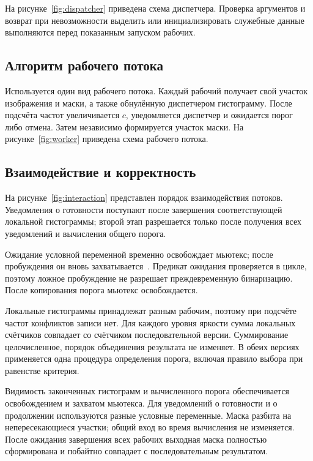 На рисунке~\ref{fig:dispatcher} приведена схема диспетчера. Проверка аргументов и возврат при невозможности выделить или инициализировать служебные данные выполняются перед показанным запуском рабочих.

\clearpage\subsection{Алгоритм рабочего потока}
Используется один вид рабочего потока. Каждый рабочий получает свой участок изображения и маски, а также обнулённую диспетчером гистограмму. После подсчёта частот увеличивается $c$, уведомляется диспетчер и ожидается порог либо отмена. Затем независимо формируется участок маски. На рисунке~\ref{fig:worker} приведена схема рабочего потока.

\clearpage\subsection{Взаимодействие и корректность}
На рисунке~\ref{fig:interaction} представлен порядок взаимодействия потоков. Уведомления о готовности поступают после завершения соответствующей локальной гистограммы; второй этап разрешается только после получения всех уведомлений и вычисления общего порога.

Ожидание условной переменной временно освобождает мьютекс; после пробуждения он вновь захватывается~\cite{posix}. Предикат ожидания проверяется в цикле, поэтому ложное пробуждение не разрешает преждевременную бинаризацию. После копирования порога мьютекс освобождается.

Локальные гистограммы принадлежат разным рабочим, поэтому при подсчёте частот конфликтов записи нет. Для каждого уровня яркости сумма локальных счётчиков совпадает со счётчиком последовательной версии. Суммирование целочисленное, порядок объединения результата не изменяет. В обеих версиях применяется одна процедура определения порога, включая правило выбора при равенстве критерия.

Видимость законченных гистограмм и вычисленного порога обеспечивается освобождением и захватом мьютекса. Для уведомлений о готовности и о продолжении используются разные условные переменные. Маска разбита на непересекающиеся участки; общий вход во время вычисления не изменяется. После ожидания завершения всех рабочих выходная маска полностью сформирована и побайтно совпадает с последовательным результатом.

